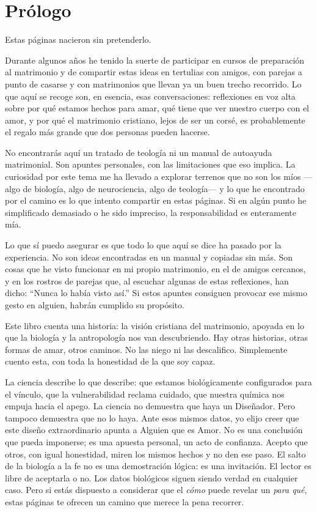 \chapter*{Prólogo}


Estas páginas nacieron sin pretenderlo.

Durante algunos años he tenido la suerte de participar en cursos de preparación al matrimonio y de compartir estas ideas en tertulias con amigos, con parejas a punto de casarse y con matrimonios que llevan ya un buen trecho recorrido. Lo que aquí se recoge son, en esencia, esas conversaciones: reflexiones en voz alta sobre por qué estamos hechos para amar, qué tiene que ver nuestro cuerpo con el amor, y por qué el matrimonio cristiano, lejos de ser un corsé, es probablemente el regalo más grande que dos personas pueden hacerse.

No encontrarás aquí un tratado de teología ni un manual de autoayuda matrimonial. Son apuntes personales, con las limitaciones que eso implica. La curiosidad por este tema me ha llevado a explorar terrenos que no son los míos ---algo de biología, algo de neurociencia, algo de teología--- y lo que he encontrado por el camino es lo que intento compartir en estas páginas. Si en algún punto he simplificado demasiado o he sido impreciso, la responsabilidad es enteramente mía.

Lo que sí puedo asegurar es que todo lo que aquí se dice ha pasado por la experiencia. No son ideas encontradas en un manual y copiadas sin más. Son cosas que he visto funcionar en mi propio matrimonio, en el de amigos cercanos, y en los rostros de parejas que, al escuchar algunas de estas reflexiones, han dicho: ``Nunca lo había visto así.'' Si estos apuntes consiguen provocar ese mismo gesto en alguien, habrán cumplido su propósito.

Este libro cuenta una historia: la visión cristiana del matrimonio, apoyada en lo que la biología y la antropología nos van descubriendo. Hay otras historias, otras formas de amar, otros caminos. No las niego ni las descalifico. Simplemente cuento esta, con toda la honestidad de la que soy capaz.

La ciencia describe lo que describe: que estamos biológicamente configurados para el vínculo, que la vulnerabilidad reclama cuidado, que nuestra química nos empuja hacia el apego. La ciencia no demuestra que haya un Diseñador. Pero tampoco demuestra que no lo haya. Ante esos mismos datos, yo elijo creer que este diseño extraordinario apunta a Alguien que es Amor. No es una conclusión que pueda imponerse; es una apuesta personal, un acto de confianza. Acepto que otros, con igual honestidad, miren los mismos hechos y no den ese paso. El salto de la biología a la fe no es una demostración lógica: es una invitación. El lector es libre de aceptarla o no. Los datos biológicos siguen siendo verdad en cualquier caso. Pero si estás dispuesto a considerar que el \emph{cómo} puede revelar un \emph{para qué}, estas páginas te ofrecen un camino que merece la pena recorrer.


